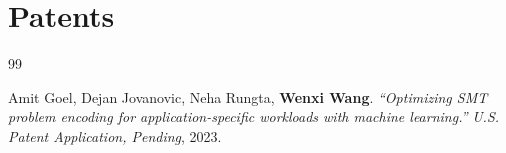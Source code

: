 \section{Patents}
\vspace{-3ex}




\renewcommand{\refname}{\vspace{-1cm}}

\begin{thebibliography}{99} %
	
	Amit Goel, Dejan Jovanovic, Neha Rungta, \textbf{Wenxi Wang}. 
		\emph{``Optimizing SMT problem encoding for application-specific workloads with machine learning.''}
		\textit{U.S. Patent Application, Pending}, 2023. 
	
	
\end{thebibliography}



